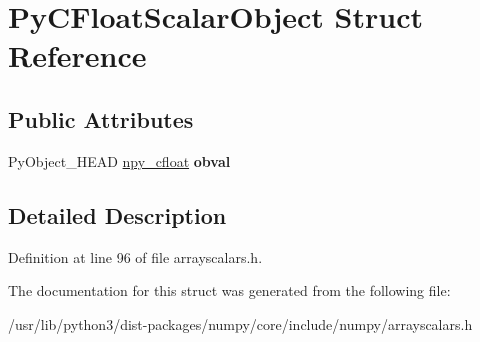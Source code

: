 \hypertarget{structPyCFloatScalarObject}{}\section{Py\+C\+Float\+Scalar\+Object Struct Reference}
\label{structPyCFloatScalarObject}
\subsection*{Public Attributes}
\begin{DoxyCompactItemize}
\item 
Py\+Object\+\_\+\+H\+E\+AD \hyperlink{structnpy__cfloat}{npy\+\_\+cfloat} {\bfseries obval}\hypertarget{structPyCFloatScalarObject_a02ecbc17085431ac73cb6f073a363641}{}\label{structPyCFloatScalarObject_a02ecbc17085431ac73cb6f073a363641}

\end{DoxyCompactItemize}


\subsection{Detailed Description}


Definition at line 96 of file arrayscalars.\+h.



The documentation for this struct was generated from the following file\+:\begin{DoxyCompactItemize}
\item 
/usr/lib/python3/dist-\/packages/numpy/core/include/numpy/arrayscalars.\+h\end{DoxyCompactItemize}
